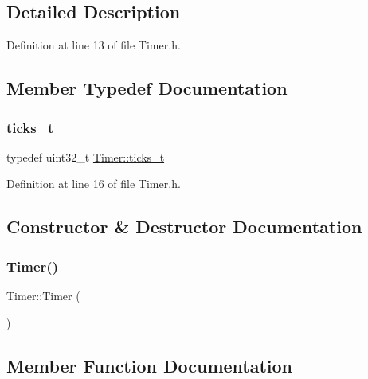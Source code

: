 \subsection{Detailed Description}


Definition at line 13 of file Timer.\+h.



\subsection{Member Typedef Documentation}
\mbox{\label{class_timer_af064c6652d9c7424aa2a69091077371d}} 
\subsubsection{\texorpdfstring{ticks\+\_\+t}{ticks\_t}}
{\footnotesize\ttfamily typedef uint32\+\_\+t \hyperlink{class_timer_af064c6652d9c7424aa2a69091077371d}{Timer\+::ticks\+\_\+t}}



Definition at line 16 of file Timer.\+h.



\subsection{Constructor \& Destructor Documentation}
\mbox{\label{class_timer_a8ed3c5e074223900c0c9a74376471209}} 
\subsubsection{\texorpdfstring{Timer()}{Timer()}}
{\footnotesize\ttfamily Timer\+::\+Timer (\begin{DoxyParamCaption}{ }\end{DoxyParamCaption})\hspace{0.3cm}{\ttfamily [default]}}



\subsection{Member Function Documentation}
\mbox{\label{class_timer_ad946179cf9404a33927ec3d33ed270d7}} 
